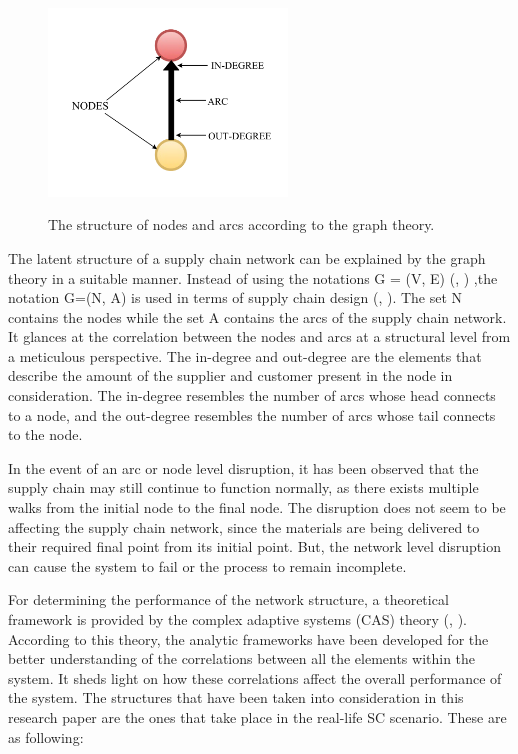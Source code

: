 \begin{figure}[H]
  \centering
  \includegraphics[width=2.5in]{figures/pdf/Node-structure.png}\\
  \caption{The structure of nodes and arcs according to the graph theory.}\label{Node structure}
\end{figure}


The latent structure of a supply chain network can be explained by the graph theory in a suitable manner. Instead of using the notations G = (V, E) (\citeauthor{emden1997complexity}, \citeyear{emden1997complexity}) ,the notation G=(N, A) is used in terms of supply chain design (\citeauthor{Kim2015}, \citeyear{Kim2015}). The set N contains the nodes while the set A contains the arcs of the supply chain network. It glances at the correlation between the nodes and arcs at a structural level from a meticulous perspective. The in-degree and out-degree are the elements that describe the amount of the supplier and customer present in the node in consideration. The in-degree resembles the number of arcs whose head connects to a node, and the out-degree resembles the number of arcs whose tail connects to the node. 

In the event of an arc or node level disruption, it has been observed that the supply chain may still continue to function normally, as there exists multiple walks from the initial node to the final node. The disruption does not seem to be affecting the supply chain network, since the materials are being delivered to their required final point from its initial point. But, the network level disruption can cause the system to fail or the process to remain incomplete.

For determining the performance of the network structure, a theoretical framework is provided by the complex adaptive systems (CAS) theory (\citeauthor{Kim2015}, \citeyear{Kim2015}). According to this theory, the analytic frameworks have been developed for the better understanding of the correlations between all the elements within the system. It sheds light on how these correlations affect the overall performance of the system. The structures that have been taken into consideration in this research paper are the ones that take place in the real-life SC scenario. These are as following:


